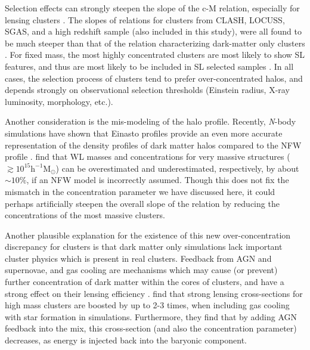 Selection effects can strongly steepen the slope of the c-M relation,
especially for lensing clusters \citep{ME14.1,ME14.2}. The slopes of relations
for clusters from CLASH, LOCUSS, SGAS, and a high redshift sample (also
included in this study), were all found to be much steeper than that of the
relation characterizing dark-matter only clusters \citep{SE15.2}. For fixed
mass, the most highly concentrated clusters are most likely to show SL
features, and thus are most likely to be included in SL selected samples
\citep{OG09.2}. In all cases, the selection process of clusters tend to prefer
over-concentrated halos, and depends strongly on observational selection
thresholds (Einstein radius, X-ray luminosity, morphology, etc.).

Another consideration is the mis-modeling of the halo profile. Recently, {\em
  N}-body simulations have shown that Einasto profiles provide an even more
accurate representation of the density profiles of dark matter halos compared
to the NFW profile \citep{DU14.1,KL14.1,ME14.2}. \citet{SE15.1} find that WL masses and
concentrations for very massive structures ($\mathrm{\gtrsim 10^{15} h^{-1}
  M_{\odot}}$) can be overestimated and underestimated, respectively, by about 
$\mathrm{\sim 10\%}$, if an NFW model is incorrectly assumed. Though this does
not fix the mismatch in the concentration parameter we have discussed here, it
could perhaps artificially steepen the overall slope of the relation by
reducing the concentrations of the most massive clusters.

Another plausible explanation for the existence of this new
over-concentration discrepancy for clusters is that dark matter only
simulations lack important cluster physics which is present in real
clusters. Feedback from AGN and supernovae, and gas cooling are mechanisms
which may cause (or prevent) further concentration of dark matter within the
cores of clusters, and have a strong effect on their lensing efficiency
\citep{PU05.1,WA08.1,RO08.1}. \citet{ME10.1} find that strong lensing
cross-sections for high mass clusters are boosted by up to 2-3 times, when
including gas cooling with star formation in simulations. Furthermore, they
find that by adding AGN feedback into the mix, this cross-section (and also the
concentration parameter) decreases, as energy is injected back into the
baryonic component.

